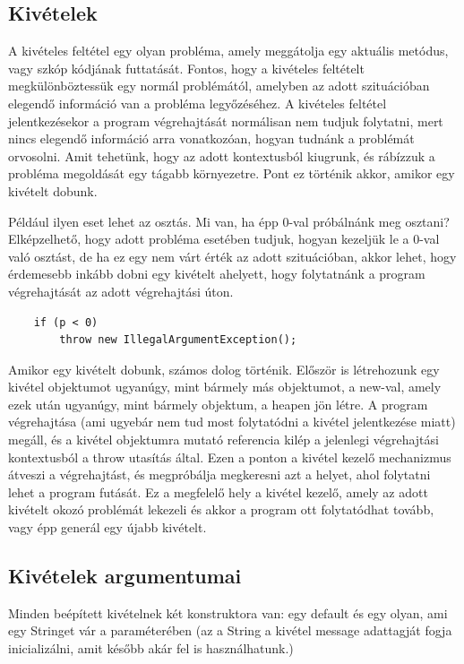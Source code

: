 \documentclass[margin=0px]{article}
\begin{document}
\subsection{Kivételek}
A kivételes feltétel egy olyan probléma, amely meggátolja egy aktuális metódus, vagy szkóp kódjának futtatását. Fontos, hogy a kivételes feltételt megkülönböztessük egy normál problémától, amelyben az adott szituációban elegendő információ van a probléma legyőzéséhez. A kivételes feltétel jelentkezésekor a program végrehajtását normálisan nem tudjuk folytatni, mert nincs elegendő információ arra vonatkozóan, hogyan tudnánk a problémát orvosolni. Amit tehetünk, hogy az adott kontextusból kiugrunk, és rábízzuk a probléma megoldását egy tágabb környezetre. Pont ez történik akkor, amikor egy kivételt dobunk.

Például ilyen eset lehet az osztás. Mi van, ha épp 0-val próbálnánk meg osztani? Elképzelhető, hogy adott probléma esetében tudjuk, hogyan kezeljük le a 0-val való osztást, de ha ez egy nem várt érték az adott szituációban, akkor lehet, hogy érdemesebb inkább dobni egy kivételt ahelyett, hogy folytatnánk a program végrehajtását az adott végrehajtási úton.

\begin{verbatim}
    if (p < 0)
        throw new IllegalArgumentException();
\end{verbatim}

Amikor egy kivételt dobunk, számos dolog történik. Először is létrehozunk egy kivétel objektumot ugyanúgy, mint bármely más objektumot, a new-val, amely ezek után ugyanúgy, mint bármely objektum, a heapen jön létre. A program végrehajtása (ami ugyebár nem tud most folytatódni a kivétel jelentkezése miatt) megáll, és a kivétel objektumra mutató referencia kilép a jelenlegi végrehajtási kontextusból a throw utasítás által. Ezen a ponton a kivétel kezelő mechanizmus átveszi a végrehajtást, és megpróbálja megkeresni azt a helyet, ahol folytatni lehet a program futását. Ez a megfelelő hely a kivétel kezelő, amely az adott kivételt okozó problémát lekezeli és akkor a program ott folytatódhat tovább, vagy épp generál egy újabb kivételt.

\subsection{Kivételek argumentumai}
Minden beépített kivételnek két konstruktora van: egy default és egy olyan, ami egy Stringet vár a paraméterében (az a String a kivétel message adattagját fogja inicializálni, amit később akár fel is használhatunk.)
\end{document}
